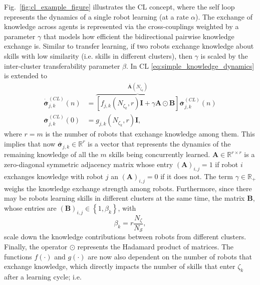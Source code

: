 Fig.~\ref{fig:cl_example_figure} illustrates the CL concept, where the self loop represents the dynamics of a single robot learning (at a rate $\alpha$). The exchange of knowledge across agents is represented via the cross-couplings weighted by a parameter $\gamma$ that models how efficient the bidirectional pairwise knowledge exchange is. Similar to transfer learning, if two robots exchange knowledge about skills with low similarity (i.e. skills in different clusters), then $\gamma$ is scaled by the inter-cluster transferability  parameter $\beta$. In CL \eqref{eq:simple_knowledge_dynamics} is extended to 
\begin{subequations}\label{eq:collective_knowledge_dynamics}
	\begin{alignat}{2}
		\dot{\bar{\bm{\sigma}}}^{(CL)}_{j,k}\left(n\right) &= \overbrace{\left[  f_{j,k}\left(N_{\zeta_k},r\right) \bm{I} + \gamma \bm{A} \odot \bm{B}  \right]}^{\bar{\bm{A}}\left(N_{\zeta_k}\right)} \bar{\bm{\sigma}}^{(CL)}_{j,k}\left(n\right)\\
		\bar{\bm{\sigma}}^{(CL)}_{j,k}(0) &= g_{j,k}\left( N_{\zeta_k}, r\right) \bm{I},
	\end{alignat}
\end{subequations}
where $r=m$ is the number of robots that exchange knowledge among them. This implies that now $\bar{\bm{\sigma}}^{}_{j,k} \in \mathbb{R}^r$ is a vector that represents the dynamics of the remaining knowledge of all the $m$ skills being concurrently learned. $\bm{A} \in \mathbb{R}^{r \times r}$ is a zero-diagonal symmetric adjacency matrix whose entry $(\bm{A})_{i,j} = 1$ if robot $i$ exchanges knowledge with robot $j$ an $(\bm{A})_{i,j} = 0$ if it does not. The term $\gamma \in \mathbb{R}_+ $ weighs the knowledge exchange strength among robots. Furthermore, since there may be robots learning skills in different clusters at the same time, the matrix $\bm{B}$, whose entries are $\left(\bm{B}\right)_{i,j} \in \left \lbrace 1, \beta_{k} \right \rbrace$, with
\begin{equation}
	\beta_{k} = r\frac{ N_\zeta}{N_\mathcal{S}}, 
\end{equation}
scale down the knowledge contributions between robots from different clusters. Finally, the operator $\odot$ represents the Hadamard product of matrices. The functions $ f(\cdot)$ and $g(\cdot)$ are now also dependent on the number of robots that exchange knowledge, which directly impacts the number of skills that enter $\zeta_k$ after a learning cycle; i.e.
